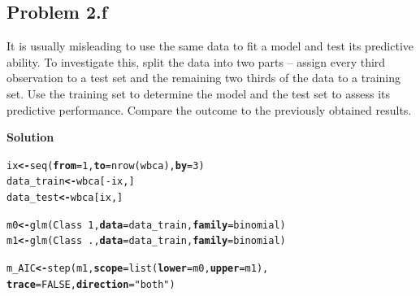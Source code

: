\documentclass[12pt,oneside,a4paper]{article}\usepackage[]{graphicx}\usepackage[]{xcolor}
\makeatletter
\newcommand{\hlnum}[1]{\textcolor[rgb]{0,0,0}{#1}}%
\newcommand{\hlstr}[1]{\textcolor[rgb]{0,0,1}{#1}}%
\newcommand{\hlopt}[1]{\textcolor[rgb]{0,0,0}{#1}}%
\newcommand{\hlstd}[1]{\textcolor[rgb]{0,0,0}{#1}}%
\newcommand{\hlkwb}[1]{\textcolor[rgb]{0.498,0,0.333}{\textbf{#1}}}%
\newcommand{\hlkwc}[1]{\textcolor[rgb]{0.498,0,0.333}{\textbf{#1}}}%
\newcommand{\hlkwd}[1]{\textcolor[rgb]{0,0,0}{#1}}%
\newenvironment{kframe}{%
 \def\at@end@of@kframe{}%
 \ifinner\ifhmode%
  \def\at@end@of@kframe{\end{minipage}}%
  \begin{minipage}{\columnwidth}%
 \fi\fi%
 \def\FrameCommand##1{\hskip\@totalleftmargin \hskip-\fboxsep
 \colorbox{shadecolor}{##1}\hskip-\fboxsep
     \hskip-\linewidth \hskip-\@totalleftmargin \hskip\columnwidth}%
 \MakeFramed {\advance\hsize-\width
   \@totalleftmargin\z@ \linewidth\hsize
   \@setminipage}}%
 {\par\unskip\endMakeFramed%
 \at@end@of@kframe}
\newenvironment{knitrout}{}{} %
\newcommand{\subproblem}[1]
{
    \subsection*{Problem {#1}}
}
\newcommand{\solution}
{
    \vspace{15pt}
    \noindent\ignorespaces\textbf{\large Solution}\par
}
\makeatother
\begin{document}
\subproblem{2.f}
It is usually misleading to use the same data to fit a model and test its predictive ability. To investigate this, split the data into two parts -- assign every third observation to a test set and the remaining two thirds of the data to a training set. Use the training set to determine the model and the test set to assess its predictive performance. Compare the outcome to the previously obtained results.

\solution
\begin{knitrout}
\color{fgcolor}\begin{kframe}
\begin{alltt}
\hlstd{ix} \hlkwb{<-} \hlkwd{seq}\hlstd{(}\hlkwc{from} \hlstd{=} \hlnum{1}\hlstd{,} \hlkwc{to} \hlstd{=} \hlkwd{nrow}\hlstd{(wbca),} \hlkwc{by} \hlstd{=} \hlnum{3}\hlstd{)}
\hlstd{data_train} \hlkwb{<-} \hlstd{wbca[}\hlopt{-}\hlstd{ix, ]}
\hlstd{data_test} \hlkwb{<-} \hlstd{wbca[ix, ]}

\hlstd{m0} \hlkwb{<-} \hlkwd{glm}\hlstd{(Class} \hlopt{~} \hlnum{1}\hlstd{,} \hlkwc{data} \hlstd{= data_train,} \hlkwc{family} \hlstd{= binomial)}
\hlstd{m1} \hlkwb{<-} \hlkwd{glm}\hlstd{(Class} \hlopt{~} \hlstd{.,} \hlkwc{data} \hlstd{= data_train,} \hlkwc{family} \hlstd{= binomial)}

\hlstd{m_AIC} \hlkwb{<-} \hlkwd{step}\hlstd{(m1,} \hlkwc{scope} \hlstd{=} \hlkwd{list}\hlstd{(}\hlkwc{lower} \hlstd{= m0,} \hlkwc{upper} \hlstd{= m1),}
              \hlkwc{trace} \hlstd{=} \hlnum{FALSE}\hlstd{,} \hlkwc{direction} \hlstd{=} \hlstr{"both"}\hlstd{)}


\end{alltt}
\end{kframe}
\end{knitrout}
\end{document}

